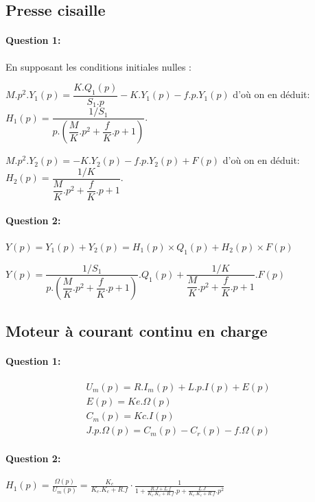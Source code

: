 \subsection{Presse cisaille}

\paragraph{Question 1:}

En supposant les conditions initiales nulles :

$M.p^2.Y_1(p)=\dfrac{K.Q_1(p)}{S_1.p}-K.Y_1(p)-f.p.Y_1(p)$ d'où on en déduit: $H_1(p)=\dfrac{1/S_1}{p.\left(\dfrac{M}{K}.p^2+\dfrac{f}{K}.p+1\right)}$.

$M.p^2.Y_2(p)=-K.Y_2(p)-f.p.Y_2(p)+F(p)$ d'où on en déduit: $H_2(p)=\dfrac{1/K}{\dfrac{M}{K}.p^2+\dfrac{f}{K}.p+1}$.

\paragraph{Question 2:}

$Y(p)=Y_1(p)+Y_2(p)=H_1(p)\times Q_1(p)+H_2(p)\times F(p)$

$Y(p)=\dfrac{1/S_1}{p.\left(\dfrac{M}{K}.p^2+\dfrac{f}{K}.p+1\right)}.Q_1(p)+
\dfrac{1/K}{\dfrac{M}{K}.p^2+\dfrac{f}{K}.p+1}.F(p)$

\subsection{Moteur à courant continu en charge}

\paragraph{Question 1:} 

\begin{eqnarray}
U_m(p)=R.I_m(p)+L.p.I(p)+E(p) \\
E(p)=Ke.\Omega(p) \\
C_m(p)=Kc.I(p) \\
J.p.\Omega(p)=C_m(p)-C_r(p)-f.\Omega(p)
\end{eqnarray}

\paragraph{Question 2:} $H_1(p)=\frac{{\Omega}(p)}{{U}_{m}(p)}=\frac{K_c}{K_e.K_c+R.f} \cdot \frac{1}{1+\frac{R.J+L.f}{K_e.K_c+R.f}.p+\frac{L.J}{K_e.K_c+R.f}.p^2}$

